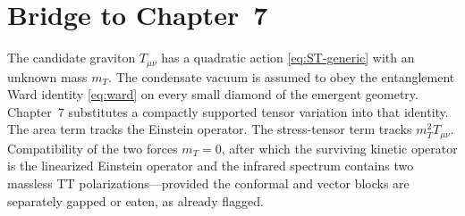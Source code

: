 \section{Bridge to Chapter~7}
\label{sec:ch6-bridge}

The candidate graviton \(T_{\mu\nu}\) has a quadratic action
\eqref{eq:ST-generic} with an unknown mass \(m_T\). The condensate
vacuum is assumed to obey the entanglement Ward identity
\eqref{eq:ward} on every small diamond of the emergent geometry.
Chapter~7 substitutes a compactly supported tensor variation into
that identity. The area term tracks the Einstein operator. The
stress-tensor term tracks \(m_T^2 T_{\mu\nu}\). Compatibility of the
two forces \(m_T=0\), after which the surviving kinetic operator is
the linearized Einstein operator and the infrared spectrum contains
two massless TT polarizations---provided the conformal and vector
blocks are separately gapped or eaten, as already flagged.
